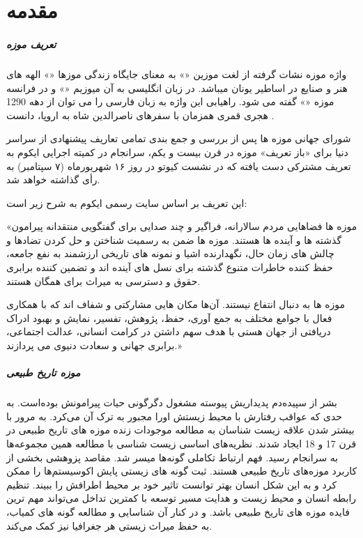 
\chapter{مقدمه} \label{chapter:introduction}

\paragraph*{تعریف موزه}

واژه موزه نشات گرفته از لغت موزین «» به معنای جایگاه زندگی موزها «» الهه های هنر و صنایع در اساطیر یونان میباشد. در زبان انگلیسی به آن میوزیم «» و در فرانسه موزه «» گفته می شود. راهیابی این واژه به زبان فارسی را می توان از دهه 1290 هجری قمری همزمان با سفرهای ناصرالدین شاه به اروپا، دانست .

شورای جهانی موزه ها پس از بررسی و جمع بندی تمامی تعاریف پیشنهادی از سراسر دنیا برای «باز تعریف» موزه در قرن بیست و یکم، سرانجام در کمیته اجرایی ایکوم به تعریف مشترکی دست یافته که در نشست کیوتو در روز ۱۶ شهریورماه (۷ سپتامبر) به رأی گذاشته خواهد شد.

این تعریف بر اساس سایت رسمی ایکوم به شرح زیر است:

«موزه ها فضاهایی مردم سالارانه، فراگیر و چند صدایی برای گفتگویی منتقدانه پیرامون گذشته ها و آینده ها هستند. موزه ها ضمن به رسمیت شناختن و حل کردن تضادها و چالش های زمان حال، نگهدارنده اشیا و نمونه های تاریخی ارزشمند به نفع جامعه، حفظ کننده خاطرات متنوع گذشته برای نسل های آینده اند و تضمین کننده برابری حقوق و دسترسی به میراث برای همگان هستند.

موزه ها به دنبال انتفاع نیستند. آن‌ها مکان هایی مشارکتی و شفاف اند که با همکاری فعال با جوامع مختلف به جمع آوری، حفظ، پژوهش، تفسیر، نمایش و بهبود ادراک دریافتی از جهان هستی با هدف سهم داشتن در کرامت انسانی، عدالت اجتماعی، برابری جهانی و سعادت دنیوی می پردازند.»

\paragraph*{موزه تاریخ طبیعی}

بشر از سپیده‌دم پدیداریش پیوسته مشغول دگرگونی حیات پیرامونش بوده‌است. به حدی که عواقب رفتارش با محیط زیستش اورا مجبور به ترک آن می‌کرد. به مرور با بیشتر شدن علاقه زیست شناسان به مطالعه موجودات زنده موزه های تاریخ طبیعی در قرن 17 و 18 ایجاد شدند. 
نظریه‌های اساسی زیست شناسی با مطالعه همین مجموعه‌ها به سرانجام رسید. فهم ارتباط تکاملی گونه‌ها میسر شد. مقاصد پزوهشی بخشی از کاربرد موزه‌های تاریخ طبیعی هستند. ثبت گونه های زیستی پایش اکوسیستم‌ها را ممکن کرد و به این شکل انسان بهتر توانست تاثیر خود بر محیط اطرافش  را ببیند. تنظیم رابطه انسان و محیط زیست و هدایت مسیر توسعه با کمترین تداخل می‌تواند مهم ترین فایده موزه های تاریخ طبیعی باشد. و در کنار آن شناسایی و مطالعه گونه های کمیاب، به حفظ میراث زیستی هر جغرافیا نیز کمک می‌کند.

